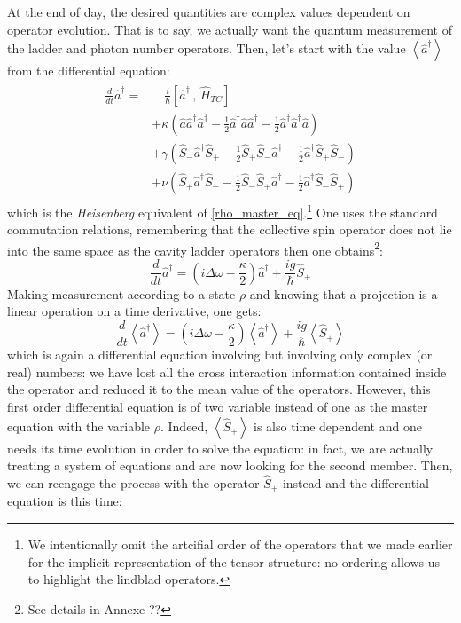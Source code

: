 \documentclass[12pt]{report}
\begin{document}
At the end of day, the desired quantities are complex values dependent on operator evolution. That is to say, we actually want the quantum measurement of the ladder and photon number operators. Then, let's start with the value $\left\langle\hat{a}^\dagger\right\rangle$ from the differential equation:
\begin{align}
\begin{split}
\frac{d}{dt}\hat{a}^\dagger = &\quad\frac{i}{\hbar}\left[ \hat{a}^\dagger \, , \,\hat{H}_{TC} \right]\\
&+ \kappa \left( \hat{a} \hat{a}^\dagger \hat{a}^\dagger - \frac{1}{2} \hat{a}^\dagger \hat{a} \hat{a}^\dagger - \frac{1}{2} \hat{a}^\dagger \hat{a}^\dagger \hat{a} \right)\\
&+ \gamma \left( \hat{S}_- \hat{a}^\dagger \hat{S}_+ - \frac{1}{2} \hat{S}_+ \hat{S}_- \hat{a}^\dagger - \frac{1}{2} \hat{a}^\dagger \hat{S}_+ \hat{S}_- \right)\\
&+ \nu \left( \hat{S}_+ \hat{a}^\dagger \hat{S}_- - \frac{1}{2} \hat{S}_- \hat{S}_+ \hat{a}^\dagger - \frac{1}{2} \hat{a}^\dagger \hat{S}_- \hat{S}_+ \right)
\end{split}
\end{align}
which is the \textit{Heisenberg} equivalent of \eqref{rho_master_eq}.\footnote{We intentionally omit the artcifial order of the operators that we made earlier for the implicit representation of the tensor structure: no ordering allows us to highlight the lindblad operators.} One uses the standard commutation relations, remembering that the collective spin operator does not lie into the same space as the cavity ladder operators then one obtains\footnote{See details in Annexe ??}:
\begin{equation}
\label{ad_pure}
\frac{d}{dt}\hat{a}^\dagger = \left(i\Delta\omega - \frac{\kappa}{2} \right) \hat{a}^\dagger + \frac{ig}{\hbar} \hat{S}_+
\end{equation}
Making measurement according to a state $\rho$ and knowing that a projection is a linear operation on a time derivative, one gets:
\begin{equation}
\label{ad_mean_field}
\frac{d}{dt}\left\langle\hat{a}^\dagger\right\rangle = \left(i\Delta\omega - \frac{\kappa}{2} \right) \left\langle\hat{a}^\dagger\right\rangle + \frac{ig}{\hbar} \left\langle\hat{S}_+\right\rangle
\end{equation}
which is again a differential equation involving but involving only complex (or real) numbers: we have lost all the cross interaction information contained inside the operator and reduced it to the mean value of the operators. However, this first order differential equation is of two variable instead of one as the master equation with the variable $\rho$. Indeed, $\left\langle\hat{S}_+\right\rangle$ is also time dependent and one needs its time evolution in order to solve the equation: in fact, we are actually treating a system of equations and are now looking for the second member. Then, we can reengage the process with the operator $\hat{S}_+$ instead and the differential equation is this time:
\end{document}
